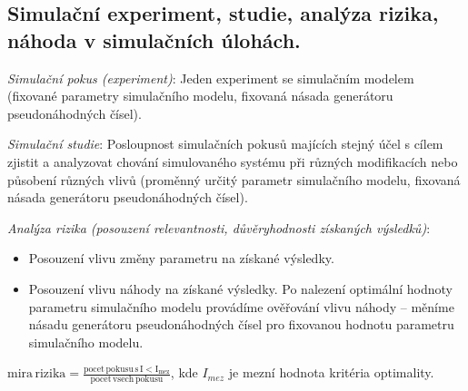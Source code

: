 \subsection{Simulační experiment, studie, analýza rizika, náhoda v simulačních úlohách.}
\textit{Simulační pokus (experiment)}: Jeden experiment se simulačním modelem (fixované parametry simulačního modelu, fixovaná násada generátoru pseudonáhodných čísel).

\textit{Simulační studie}: Posloupnost simulačních pokusů majících stejný účel s cílem zjistit a analyzovat chování simulovaného systému při různých modifikacích nebo působení různých vlivů (proměnný určitý parametr simulačního modelu, fixovaná násada generátoru pseudonáhodných čísel).

\textit{Analýza rizika (posouzení relevantnosti, důvěryhodnosti získaných výsledků)}: 
\begin{itemize}
\item Posouzení vlivu změny parametru na získané výsledky.
\item Posouzení vlivu náhody na získané výsledky. Po nalezení optimální hodnoty parametru simulačního modelu provádíme ověřování vlivu náhody – měníme násadu generátoru pseudonáhodných čísel pro fixovanou hodnotu parametru simulačního modelu.
\end{itemize}
$ \mathrm{mira \, rizika} = \frac{\mathrm{pocet \, pokusu \, s \, I < I_{mez}}}{\mathrm{pocet \, vsech \, pokusu}} $, kde $ I_{mez} $ je mezní hodnota kritéria optimality.

